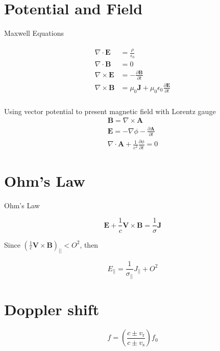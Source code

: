 \section{Potential and Field}

Maxwell Equations

\begin{eqnarray}
\begin{aligned}
    \nabla \cdot \textbf{E}{}&=\frac{\rho}{\epsilon_0}\\
    \nabla \cdot \textbf{B} &= 0\\
    \nabla \times \textbf{E} &= -\frac{\partial \textbf{B}}{\partial t}\\
     \nabla \times \textbf{B} &= \mu_0\textbf{J}+\mu_0\epsilon_0 \frac{\partial \textbf{E}}{\partial t}\\
\end{aligned}
     \label{eq:Maxwell}
\end{eqnarray}

Using vector potential to present magnetic field with Lorentz gauge
\begin{eqnarray}
     \textbf{B}= \nabla \times \textbf{A}\\
     \textbf{E}=-\nabla \phi -\frac{\partial \textbf{A}}{\partial t}\\
     \nabla \cdot \textbf{A}+ \frac{1}{c^2}\frac{\partial \phi}{\partial t}=0
\end{eqnarray}

\section{Ohm's Law}

Ohm's Law

\begin{equation}
    \textbf{E}+\frac{1}{c}\textbf{V}\times \textbf{B}= \frac{1}{\sigma}\textbf{J}
\end{equation}

Since $\left(\frac{1}{c}\textbf{V}\times \textbf{B}
\right)_{||}< O^2$, then 

\begin{equation}
    E_{||} = \frac{1}{\sigma_{||}}J_{||} + O^2
\end{equation}

\section{Doppler shift}

\begin{equation}
f=\left(\frac{c \pm v_{\mathrm{r}}}{c \pm v_{\mathrm{s}}}\right) f_{0}
\end{equation}

